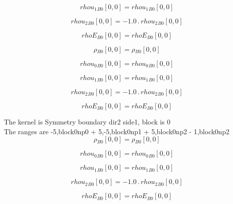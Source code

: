 \documentclass{article}
\begin{document}
\begin{dmath}{rhou_{1}{_{B0}}}[{0,0}] = {rhou_{1}{_{B0}}}[{0,0}]\end{dmath}

\begin{dmath}{rhou_{2}{_{B0}}}[{0,0}] = - 1.0 \,.\, {rhou_{2}{_{B0}}}[{0,0}]\end{dmath}

\begin{dmath}{rhoE{_{B0}}}[{0,0}] = {rhoE{_{B0}}}[{0,0}]\end{dmath}

\begin{dmath}{\rho{_{B0}}}[{0,0}] = {\rho{_{B0}}}[{0,0}]\end{dmath}

\begin{dmath}{rhou_{0}{_{B0}}}[{0,0}] = {rhou_{0}{_{B0}}}[{0,0}]\end{dmath}

\begin{dmath}{rhou_{1}{_{B0}}}[{0,0}] = {rhou_{1}{_{B0}}}[{0,0}]\end{dmath}

\begin{dmath}{rhou_{2}{_{B0}}}[{0,0}] = - 1.0 \,.\, {rhou_{2}{_{B0}}}[{0,0}]\end{dmath}

\begin{dmath}{rhoE{_{B0}}}[{0,0}] = {rhoE{_{B0}}}[{0,0}]\end{dmath}

\noindent The kernel is Symmetry boundary dir2 side1, block is 0\\\noindent The ranges are -5,block0np0 + 5,-5,block0np1 + 5,block0np2 - 1,block0np2\\\begin{dmath}{\rho{_{B0}}}[{0,0}] = {\rho{_{B0}}}[{0,0}]\end{dmath}

\begin{dmath}{rhou_{0}{_{B0}}}[{0,0}] = {rhou_{0}{_{B0}}}[{0,0}]\end{dmath}

\begin{dmath}{rhou_{1}{_{B0}}}[{0,0}] = {rhou_{1}{_{B0}}}[{0,0}]\end{dmath}

\begin{dmath}{rhou_{2}{_{B0}}}[{0,0}] = - 1.0 \,.\, {rhou_{2}{_{B0}}}[{0,0}]\end{dmath}

\begin{dmath}{rhoE{_{B0}}}[{0,0}] = {rhoE{_{B0}}}[{0,0}]\end{dmath}
\end{document}
